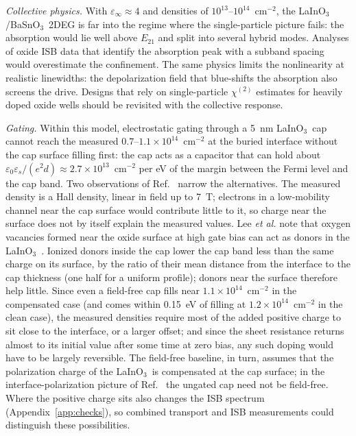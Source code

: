 \documentclass[11pt]{article}
\newcommand{\LIO}{\texorpdfstring{LaInO$_3$}{LaInO3}}
\newcommand{\BSO}{\texorpdfstring{BaSnO$_3$}{BaSnO3}}
\begin{document}
\emph{Collective physics.} With $\varepsilon_\infty\approx4$ and densities of $10^{13}$--$10^{14}$~cm$^{-2}$, the \LIO/\BSO\ 2DEG is far into the regime where the single-particle picture fails: the absorption would lie well above $E_{21}$ and split into several hybrid modes. Analyses of oxide ISB data that identify the absorption peak with a subband spacing would overestimate the confinement. The same physics limits the nonlinearity at realistic linewidths: the depolarization field that blue-shifts the absorption also screens the drive. Designs that rely on single-particle $\chi^{(2)}$ estimates for heavily doped oxide wells should be revisited with the collective response.

\emph{Gating.} Within this model, electrostatic gating through a 5~nm \LIO\ cap cannot reach the measured $0.7$--$1.1\times10^{14}$~cm$^{-2}$ at the buried interface without the cap surface filling first: the cap acts as a capacitor that can hold about $\varepsilon_0\varepsilon_s/(e^2d)\approx2.7\times10^{13}$~cm$^{-2}$ per eV of the margin between the Fermi level and the cap band. Two observations of Ref.~\cite{Lee2024LIO} narrow the alternatives. The measured density is a Hall density, linear in field up to 7~T; electrons in a low-mobility channel near the cap surface would contribute little to it, so charge near the surface does not by itself explain the measured values. Lee \emph{et al.} note that oxygen vacancies formed near the oxide surface at high gate bias can act as donors in the \LIO\ \cite{Lee2024LIO}. Ionized donors inside the cap lower the cap band less than the same charge on its surface, by the ratio of their mean distance from the interface to the cap thickness (one half for a uniform profile); donors near the surface therefore help little. Since even a field-free cap fills near $1.1\times10^{14}$~cm$^{-2}$ in the compensated case (and comes within 0.15~eV of filling at $1.2\times10^{14}$~cm$^{-2}$ in the clean case), the measured densities require most of the added positive charge to sit close to the interface, or a larger offset; and since the sheet resistance returns almost to its initial value after some time at zero bias, any such doping would have to be largely reversible. The field-free baseline, in turn, assumes that the polarization charge of the \LIO\ is compensated at the cap surface; in the interface-polarization picture of Ref.~\cite{Kim2019LIO} the ungated cap need not be field-free. Where the positive charge sits also changes the ISB spectrum (Appendix~\ref{app:checks}), so combined transport and ISB measurements could distinguish these possibilities.
\end{document}
